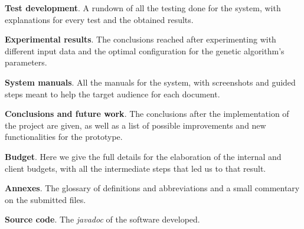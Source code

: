 \begin{description}
    \item \textbf{Test development}. A rundown of all the testing done for the system, with explanations for every test and the obtained results. 

    \item \textbf{Experimental results}. The conclusions reached after experimenting with different input data and the optimal configuration for the genetic algorithm's parameters. 

    \item \textbf{System manuals}. All the manuals for the system, with screenshots and guided steps meant to help the target audience for each document. 

    \item \textbf{Conclusions and future work}. The conclusions after the implementation of the project are given, as well as a list of possible improvements and new functionalities for the prototype. 

    \item \textbf{Budget}. Here we give the full details for the elaboration of the internal and client budgets, with all the intermediate steps that led us to that result. 

    \item \textbf{Annexes}. The glossary of definitions and abbreviations and a small commentary on the submitted files.

    \item \textbf{Source code}. The \textit{javadoc} of the software developed. 

\end{description}

